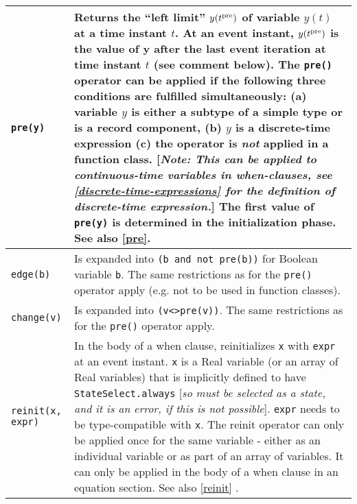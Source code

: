 \begin{longtable}{|p{5cm}|p{8cm}|}
\lstinline[basicstyle=\ttfamily]!pre(y)! & Returns the ``left limit'' $y(t\textsuperscript{pre})$ of
variable $y(t)$ at a time instant $t$. At an event instant,
$y(t\textsuperscript{pre})$ is the value of y after the last event
iteration at time instant $t$ (see comment below). The \lstinline[basicstyle=\ttfamily]!pre()! operator can
be applied if the following three conditions are fulfilled
simultaneously: (a) variable $y$ is either a subtype of a simple type or
is a record component, (b) $y$ is a discrete-time expression (c) the
operator is \emph{not} applied in a function class. {[}\emph{Note: This
can be applied to continuous-time variables in when-clauses, see
\autoref{discrete-time-expressions} for the definition of discrete-time expression.}{]}
The first value of \lstinline[basicstyle=\ttfamily]!pre(y)! is determined in the initialization phase. See
also \autoref{pre}.\\ \hline

\lstinline[basicstyle=\ttfamily]!edge(b)! & Is expanded into \lstinline[basicstyle=\ttfamily]!(b and not pre(b))! for Boolean variable
\lstinline[basicstyle=\ttfamily]!b!. The same restrictions as for the \lstinline[basicstyle=\ttfamily]!pre()! operator apply (e.g. not to be
used in function classes).\\ \hline

\lstinline[basicstyle=\ttfamily]!change(v)! & Is expanded into \lstinline[basicstyle=\ttfamily]!(v<>pre(v))!. The
same restrictions as for the \lstinline[basicstyle=\ttfamily]!pre()! operator apply.\\ \hline

\lstinline[basicstyle=\ttfamily]!reinit(x, expr)! & In the body of a when clause, reinitializes \lstinline[basicstyle=\ttfamily]!x! with
\lstinline[basicstyle=\ttfamily]!expr! at an event instant. \lstinline[basicstyle=\ttfamily]!x! is a Real variable (or an array of Real variables) that is implicitly defined to have \lstinline[basicstyle=\ttfamily]!StateSelect.always!
{[}\emph{so must be selected as a state, and it is an error, if
this is not possible}{]}. \lstinline[basicstyle=\ttfamily]!expr! needs to be type-compatible with \lstinline[basicstyle=\ttfamily]!x!. The
reinit operator can only be applied once for the same variable - either
as an individual variable or as part of an array of variables. It can
only be applied in the body of a when clause in an equation section. See
also \autoref{reinit} .\\ \hline

\end{longtable}

